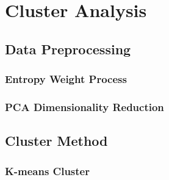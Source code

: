 
\chapter{Cluster Analysis}



\section{Data Preprocessing}
\subsection{Entropy Weight Process}

\subsection{PCA Dimensionality Reduction}


\section{Cluster Method}



\subsection{K-means Cluster}

